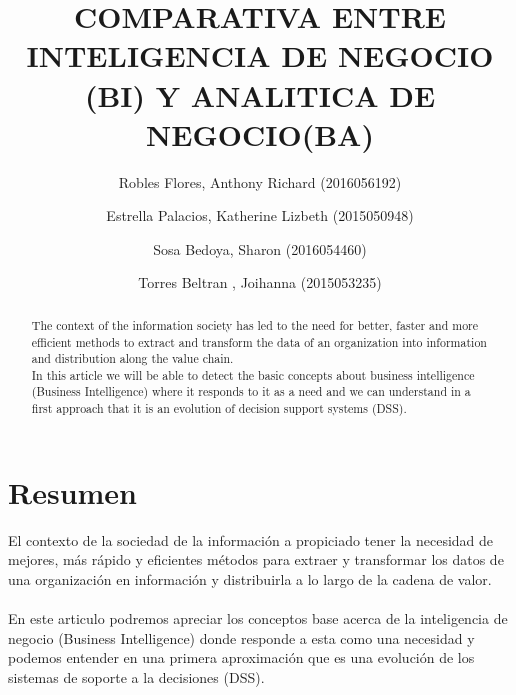 \documentclass[preprint,12pt]{elsarticle}
\begin{document}
	
	\begin{frontmatter}

		\title{\huge  COMPARATIVA ENTRE INTELIGENCIA DE NEGOCIO (BI) Y ANALITICA DE NEGOCIO(BA) }
		\author{Robles Flores, Anthony Richard	                (2016056192)}
		\author{Estrella Palacios, Katherine Lizbeth			(2015050948)}
		\author{Sosa Bedoya, Sharon					(2016054460)}
		\author{Torres Beltran , Joihanna				(2015053235)}
		\address{Tacna, Perú}
		


\begin{abstract}
The context of the information society has led to the need for better, faster and more efficient methods 
to extract and transform the data of an organization into information and distribution along the value chain.
\\
In this article we will be able to detect the basic concepts about business intelligence (Business Intelligence) 
where it responds to it as a need and we can understand in a first approach that it is an evolution of decision 
support systems (DSS).
\end{abstract}


\end{frontmatter}

\section{Resumen}
El contexto de la sociedad de la información a propiciado tener la necesidad de mejores, más rápido y eficientes 
métodos para extraer y transformar los datos de una organización en información y distribuirla a lo largo de la 
cadena de valor.
\\
\\
En este articulo podremos apreciar los conceptos base acerca de la inteligencia de negocio (Business Intelligence)
 donde responde a esta como una necesidad y podemos entender en una primera aproximación que es una 
evolución de los sistemas de soporte a la decisiones (DSS).


\end{document}
